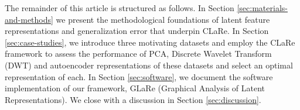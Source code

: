 The remainder of this article is structured as follows.
In Section \ref{sec:materials-and-methods} we present the methodological foundations of latent feature representations and generalization error that underpin CLaRe. 
In Section \ref{sec:case-studies}, we introduce three motivating datasets and employ the CLaRe framework to assess the performance of PCA, Discrete Wavelet Transform (DWT) and autoencoder representations of these datasets and select an optimal representation of each.
In Section \ref{sec:software}, we document the software implementation of our framework, GLaRe (Graphical Analysis of Latent Representations).
We close with a discussion in Section \ref{sec:discussion}.